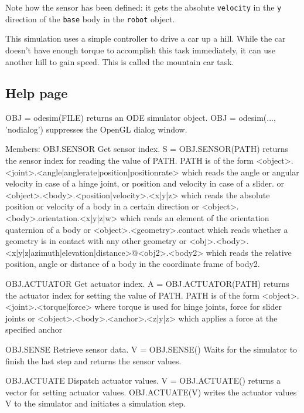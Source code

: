\documentclass{article}
\newcommand{\txt}[1]{\texttt{#1}}
\newenvironment{code}{\alltt\small}{\endalltt}
\begin{document}
Note how the sensor has been defined: it gets the absolute \txt{velocity} in the \txt{y} direction of the \txt{base} body in the \txt{robot} object.

This simulation uses a simple controller to drive a car up a hill. While the car doesn't have enough torque to accomplish this task immediately, it can use another hill to gain speed. This is called the mountain car task.

\subsection{Help page}
\begin{code}
    OBJ = odesim(FILE) returns an ODE simulator object.
    OBJ = odesim(..., 'nodialog') suppresses the OpenGL dialog window.
 
    Members:
       OBJ.SENSOR Get sensor index.
          S = OBJ.SENSOR(PATH) returns the sensor index for reading the
          value of PATH. PATH is of the form
             <object>.<joint>.<angle|anglerate|position|positionrate>
             which reads the angle or angular velocity in case of a hinge
             joint, or position and velocity in case of a slider.
          or
             <object>.<body>.<position|velocity>.<x|y|z>
             which reads the absolute position or velocity of a body in
             a certain direction
          or
             <object>.<body>.orientation.<x|y|z|w>
             which reads an element of the orientation quaternion of a body
          or
             <object>.<geometry>.contact
             which reads whether a geometry is in contact with any other
             geometry
          or
             <obj>.<body>.<x|y|z|azimuth|elevation|distance>@<obj2>.<body2>
             which reads the relative position, angle or distance of a
             body in the coordinate frame of body2.
 
       OBJ.ACTUATOR Get actuator index.
          A = OBJ.ACTUATOR(PATH) returns the actuator index for setting the
          value of PATH. PATH is of the form
             <object>.<joint>.<torque|force>
             where torque is used for hinge joints, force for slider joints
          or
             <object>.<body>.<anchor>.<z|y|z>
             which applies a force at the specified anchor
 
       OBJ.SENSE Retrieve sensor data.
          V = OBJ.SENSE() Waits for the simulator to finish the last
          step and returns the sensor values.
 
       OBJ.ACTUATE Dispatch actuator values.
          V = OBJ.ACTUATE() returns a vector for setting actuator values.
          OBJ.ACTUATE(V) writes the actuator values V to the simulator
          and initiates a simulation step.
 

\end{code}
\end{document}

